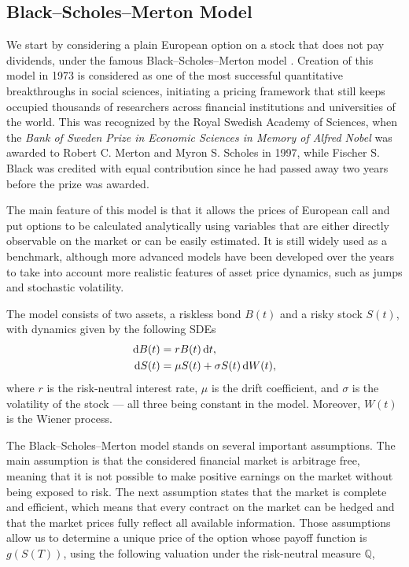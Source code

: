 \documentclass{UUThesisTemplate}
\begin{document}
\subsection{Black--Scholes--Merton Model}
\label{sub:bs}
\par We start by considering a plain European option on a stock that does not pay dividends, under the famous Black--Scholes--Merton model \cite{black73,merton73}. Creation of this model in 1973 is considered as one of the most successful quantitative breakthroughs in social sciences, initiating a pricing framework that still keeps occupied thousands of researchers across financial institutions and universities of the world. This was recognized by the Royal Swedish Academy of Sciences, when the \emph{Bank of Sweden Prize in Economic Sciences in Memory of Alfred Nobel} was awarded to Robert C. Merton and Myron S. Scholes in 1997, while Fischer S. Black was credited with equal contribution since he had passed away two years before the prize was awarded. 
\par The main feature of this model is that it allows the prices of European call and put options to be calculated analytically using variables that are either directly observable on the market or can be easily estimated. It is still widely used as a benchmark, although more advanced models have been developed over the years to take into account more realistic features of asset price dynamics, such as jumps and stochastic volatility.
\par The model consists of two assets, a riskless bond $B(t)$ and a risky stock $S(t)$, with dynamics given by the following SDEs
\begin{align}
\dif B(t) &= r B(t) \dif t, \label{eq:bond} \\
\dif S(t) &= \mu S(t) + \sigma S(t) \dif W(t), \label{eq:stock}
\end{align}
where $r$ is the risk-neutral interest rate, $\mu$ is the drift coefficient, and $\sigma$ is the volatility of the stock --- all three being constant in the model. Moreover, $W(t)$ is the Wiener process.
\par The Black--Scholes--Merton model stands on several important assumptions. The main assumption is that the considered financial market is arbitrage free, meaning that it is not possible to make positive earnings on the market without being exposed to risk. The next assumption states that the market is complete and efficient, which means that every contract on the market can be hedged and that the market prices fully reflect all available information. Those assumptions allow us to determine a unique price of the option whose payoff function is $g(S(T))$, using the following valuation under the risk-neutral measure $\mathbb{Q}$,
\end{document}
